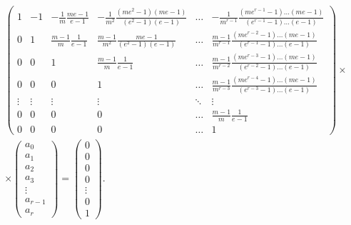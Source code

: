 \begin{multline}
\begin{pmatrix}
1 & -1 & -\frac{1}{m}\frac{me - 1}{e - 1} & -\frac{1}{m^2}\frac{\left(me^{2} - 1\right)\left(me - 1\right)}{\left(e^{2} - 1\right)\left(e - 1\right)} & \ldots & -\frac{1}{m^{r - 1}}\frac{\left(me^{r - 1} - 1\right)\ldots\left(me - 1\right)}{\left(e^{r - 1} - 1\right)\ldots\left(e - 1\right)}\\[2mm]
0 & 1 & \frac{m - 1}{m} \frac{1}{e - 1} & \frac{m - 1}{m^2} \frac{me - 1}{\left(e^{2} - 1\right)\left(e - 1\right)} & \dots & \frac{m - 1}{m^{r - 1}}\frac{\left(me^{r - 2} - 1\right)\dots\left(me - 1\right)}{\left(e^{r - 1} - 1\right)\dots\left(e - 1\right)}\\[2mm]
0 & 0 & 1 & \frac{m - 1}{m} \frac{1}{e - 1} & \dots &  \frac{m - 1}{m^{r - 2}}\frac{\left(me^{r - 3} - 1\right)\ldots\left(me - 1\right)}{\left(e^{r - 2} - 1\right)\ldots\left(e - 1\right)}\\
0 & 0 & 0 & 1 & \ldots & \frac{m - 1}{m^{r - 3}}\frac{\left(me^{r - 4} - 1\right)\ldots\left(me - 1\right)}{\left(e^{r - 3} - 1\right)\ldots\left(e - 1\right)}\\[2mm]
\vdots & \vdots & \vdots & \vdots & \ddots & \vdots\\[2mm]
0 & 0 & 0 & 0 & \ldots & \frac{m - 1}{m} \frac{1}{e - 1}\\[2mm]
0 & 0 & 0 & 0 & \ldots & 1
\end{pmatrix}\times
\\
\times \begin{pmatrix} a_0\\a_1\\a_2\\a_3\\\vdots\\a_{r - 1}\\a_r\end{pmatrix}= \begin{pmatrix} 0\\0\\0\\0\\\vdots\\0\\1\end{pmatrix}. \label{sizova:sysforcoef}
\end{multline}

